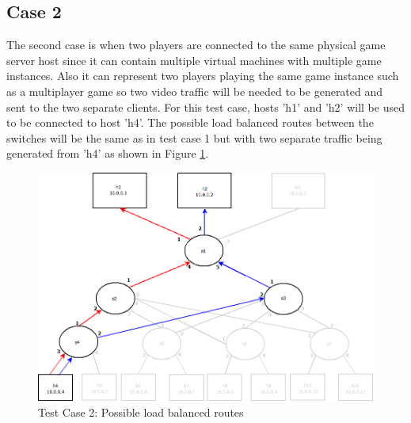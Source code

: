 \subsection{Case 2}
The second case is when two players are connected to the same physical game server host since it can contain multiple virtual machines with multiple game instances. Also it can represent two players playing the same game instance such as a multiplayer game so two video traffic will be needed to be generated and sent to the two separate clients. For this test case, hosts 'h1' and 'h2' will be used to be connected to host 'h4'. The possible load balanced routes between the switches will be the same as in test case 1 but with two separate traffic being generated from 'h4' as shown in Figure \ref{fig:test2}.
\newline
\begin{figure}[h!]
 \includegraphics[width=\linewidth]{images/test2.png}
 \caption{Test Case 2: Possible load balanced routes}
 \label{fig:test2}
\end{figure}

\clearpage
